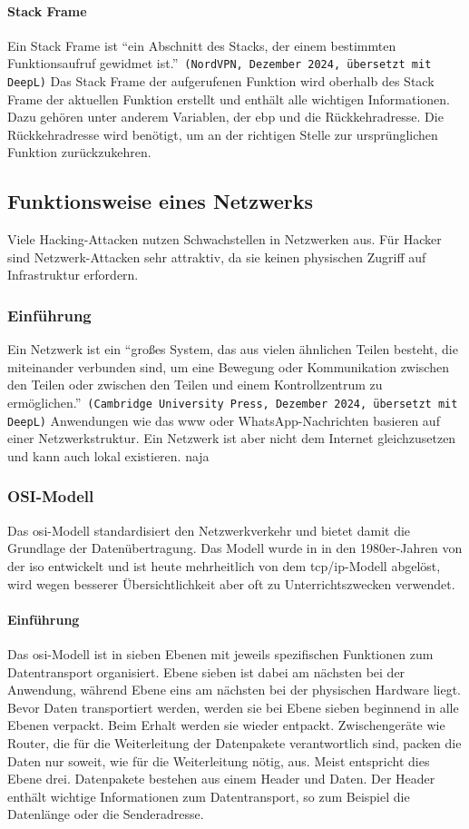\documentclass[11pt, a4paper]{article}
\begin{document}
\paragraph{Stack Frame}
Ein Stack Frame ist ``ein Abschnitt des Stacks, der einem bestimmten Funktionsaufruf gewidmet ist.''~\texttt{(NordVPN, Dezember 2024, übersetzt mit DeepL)}\cite{StackFrameNordVPN:online} Das Stack Frame der aufgerufenen Funktion wird oberhalb des Stack Frame der aktuellen Funktion erstellt und enthält alle wichtigen Informationen. Dazu gehören unter anderem Variablen, der \gls{ebp} und die Rückkehradresse. Die Rückkehradresse wird benötigt, um an der richtigen Stelle zur ursprünglichen Funktion zurückzukehren.

\subsection{Funktionsweise eines Netzwerks}
Viele Hacking-Attacken nutzen Schwachstellen in Netzwerken aus. Für Hacker sind Netzwerk-Attacken sehr attraktiv, da sie keinen physischen Zugriff auf Infrastruktur erfordern.
\subsubsection{Einführung}
Ein Netzwerk ist ein ``großes System, das aus vielen ähnlichen Teilen besteht, die miteinander verbunden sind, um eine Bewegung oder Kommunikation zwischen den Teilen oder zwischen den Teilen und einem Kontrollzentrum zu ermöglichen.''~\texttt{(Cambridge University Press, Dezember 2024, übersetzt mit DeepL)} Anwendungen wie das \gls{www} oder WhatsApp-Nachrichten basieren auf einer Netzwerkstruktur. Ein Netzwerk ist aber nicht dem Internet gleichzusetzen und kann auch lokal existieren. naja

\subsubsection{OSI-Modell}
Das \gls{osi}-Modell standardisiert den Netzwerkverkehr und bietet damit die Grundlage der Datenübertragung. Das Modell wurde in in den 1980er-Jahren von der \gls{iso} entwickelt und ist heute mehrheitlich von dem \gls{tcp}/\gls{ip}-Modell abgelöst, wird wegen besserer Übersichtlichkeit aber oft zu Unterrichtszwecken verwendet.~\cite{OSImodelWikipedia:online}
\paragraph{Einführung}
Das \gls{osi}-Modell ist in sieben Ebenen mit jeweils spezifischen Funktionen zum Datentransport organisiert. Ebene sieben ist dabei am nächsten bei der Anwendung, während Ebene eins am nächsten bei der physischen Hardware liegt. Bevor Daten transportiert werden, werden sie bei Ebene sieben beginnend in alle Ebenen verpackt. Beim Erhalt werden sie wieder entpackt. Zwischengeräte wie Router, die für die Weiterleitung der Datenpakete verantwortlich sind, packen die Daten nur soweit, wie für die Weiterleitung nötig, aus. Meist entspricht dies Ebene drei. Datenpakete bestehen aus einem Header und Daten. Der Header enthält wichtige Informationen zum Datentransport, so zum Beispiel die Datenlänge oder die Senderadresse. 
\end{document}
